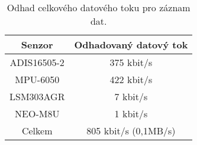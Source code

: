 \begin{table}[h!]
\caption{Odhad celkového datového toku pro záznam dat.} 
\centering
\begin{tabular}{c|c}

Senzor & Odhadovaný datový tok \\ 
\hline 
\hline 
ADIS16505-2 & 375 kbit/s \\ 

MPU-6050 & 422 kbit/s \\ 

LSM303AGR & 7 kbit/s \\ 

NEO-M8U & 1 kbit/s \\ 
\hline

Celkem & 805 kbit/s (0,1MB/s) \\ 

\end{tabular} 

\label{table:memoryBW}
\end{table} 